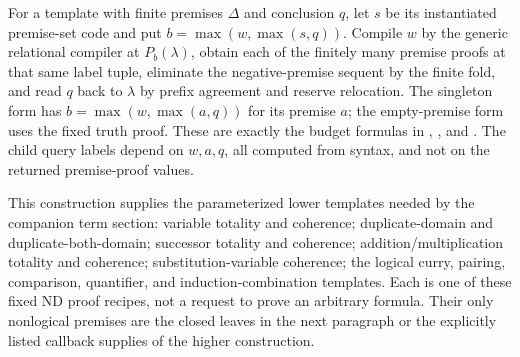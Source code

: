 For a template with finite premises $\Delta$ and conclusion $q$,
let $s$ be its instantiated premise-set code and put
$b=\max(w,\max(s,q))$.  Compile $w$ by the generic relational
compiler at $P_b(\lambda)$, obtain each of the finitely many premise
proofs at that same label tuple, eliminate the negative-premise
sequent by the finite fold, and read $q$ back to $\lambda$ by
prefix agreement and reserve relocation.  The singleton form has
$b=\max(w,\max(a,q))$ for its premise $a$; the empty-premise form
uses the fixed truth proof.  These are exactly the budget formulas
in ,
, and
.
The child query labels depend on $w,a,q$, all computed from syntax,
and not on the returned premise-proof values.

This construction supplies the parameterized lower templates needed
by the companion term section: variable totality and coherence;
duplicate-domain and duplicate-both-domain; successor totality and
coherence; addition/multiplication totality and coherence;
substitution-variable coherence; the logical curry, pairing,
comparison, quantifier, and induction-combination templates.
Each is one of these fixed ND proof recipes, not a request to prove
an arbitrary formula.  Their only nonlogical premises are the
closed leaves in the next paragraph or the explicitly listed
callback supplies of the higher construction.

